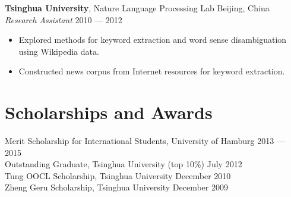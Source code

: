 \documentclass[a4paper,9pt]{extarticle} %
\begin{document}

\textbf{Tsinghua University}, Nature Language Processing Lab \hfill Beijing, China \\
\textit{Research Assistant} \hfill 2010 --- 2012
\vspace{-\parskip}
\begin{itemize}
  \item Explored methods for keyword extraction and word sense disambiguation using Wikipedia data.
  \item Constructed news corpus from Internet resources for keyword extraction.
\end{itemize}


\section{Scholarships and Awards}

Merit Scholarship for International Students, University of Hamburg \hfill 2013 --- 2015 \\
Outstanding Graduate, Tsinghua University (top 10\%) \hfill July 2012 \\
Tung OOCL Scholarship, Tsinghua University \hfill December 2010  \\
Zheng Geru Scholarship, Tsinghua University \hfill December 2009

\fi

\end{document}
